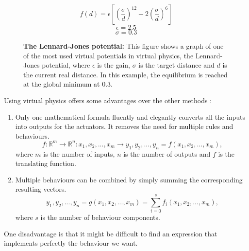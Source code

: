\documentclass[oneside, a4paper, 12pt]{memoir}
\let\oldCaption\caption
\renewcommand{\caption}[2]{
\oldCaption[#1]{{\small\sffamily\bfseries #1:} #2}
}
\begin{document}
	\begin{figure}[!htp]
	\begin{minipage}[c]{0.6\textwidth}
	\end{minipage}
	\hfill
	\begin{minipage}[c]{0.4\textwidth}
		$$f(d) = \epsilon \left[ \left(\frac{\sigma}{d}\right)^{12} - 2 \left(\frac{\sigma}{d}\right)^6 \right]$$
		$$\epsilon = 2.5$$
		$$\sigma = 0.3$$
	\end{minipage}
		
		\caption{The Lennard-Jones potential}{This figure shows a graph of one of the most used virtual potentials in virtual physics, the Lennard-Jones potential, where $\epsilon$ is the gain, $\sigma$ is the target distance and $d$ is the current real distance. In this example, the equilibrium is reached at the global minimum at $0.3$.}
		\label{fig:lennard-jones_potential}
	\end{figure}
	
	Using virtual physics offers some advantages over the other methods \citep{brambilla2013swarm}:
	
	\begin{enumerate}
		\item Only one mathematical formula fluently and elegantly converts all the inputs into outputs for the actuators. It removes the need for multiple rules and behaviours.
		$$f:\mathbb{R}^m \rightarrow \mathbb{R}^n:x_1,x_2,...,x_m \rightarrow y_1,y_2,...,y_n = f(x_1,x_2,...,x_m)\mbox{,}$$ where $m$ is the number of inputs, $n$ is the number of outputs and $f$ is the translating function.
		
		\item Multiple behaviours can be combined by simply summing the corresponding resulting vectors.
		$$y_1,y_2,...,y_n = g(x_1,x_2,...,x_m) = \sum_{i=0}^{s}{f_i(x_1,x_2,...,x_m)}\mbox{,}$$ where $s$ is the number of behaviour components.
	\end{enumerate}
One disadvantage is that it might be difficult to find an expression that implements perfectly the behaviour we want.
	
\end{document}
